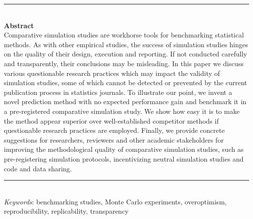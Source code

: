 \documentclass[a4paper, 11pt]{article}
\title{
  \vspace{-4em}
  \textbf{\longtitle} \\
  \subtitle
}
\author{
  \textbf{\longauthors} \\
  \affiliation \\
  \small\{samuel.pawel, lucasheinrich.kook, kelly.reeve\}@uzh.ch
}
\date{} %
\begin{document}
\maketitle

\begin{center}
\begin{minipage}{13cm}
{\small
\rule{\textwidth}{0.5pt} \\
{\centering \textbf{Abstract} \\
Comparative simulation studies are workhorse tools for benchmarking statistical methods. As with other empirical studies, the success of simulation studies hinges on the quality of their design, execution and reporting. If not conducted carefully and transparently, their conclusions may be misleading. In this paper we discuss various questionable research practices which may impact the validity of simulation studies, some of which cannot be detected or prevented by the current publication process in statistics journals.
To illustrate our point, we invent a novel prediction method with no expected performance gain and benchmark it in a pre-registered comparative simulation study. We show how easy it is to make the method appear superior over well-established competitor methods if questionable research practices are employed. Finally, we provide concrete suggestions for researchers, reviewers and other academic stakeholders for improving the methodological quality of comparative simulation studies, such as pre-registering simulation protocols, incentivizing neutral simulation studies and code and data sharing.
}
\rule{\textwidth}{0.4pt} \\
\textit{Keywords}:
benchmarking studies, Monte Carlo experiments, overoptimism,
reproducibility, replicability, transparency
}
\end{minipage}
\end{center}
\end{document}
